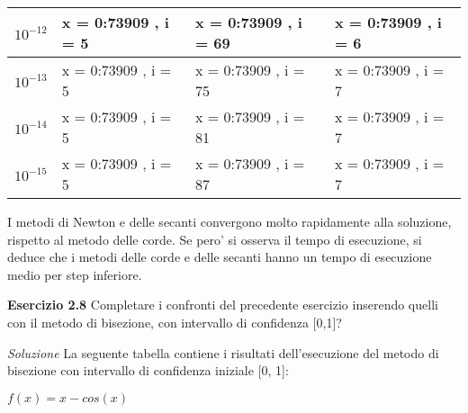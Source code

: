 \documentclass[20pt,a4paper]{book}
\begin{document}
\begin{tabular}{|l|l|l|l|}
\hline
\begin{math}10^{-12}\end{math} & x = 0:73909 , i = 5 & x = 0:73909 , i = 69 & x = 0:73909 , i = 6\\
\hline
\begin{math}10^{-13}\end{math} & x = 0:73909 , i = 5 & x = 0:73909 , i = 75 & x = 0:73909 , i = 7\\
\hline
\begin{math}10^{-14}\end{math} & x = 0:73909 , i = 5 & x = 0:73909 , i = 81 & x = 0:73909 , i = 7\\
\hline
\begin{math}10^{-15}\end{math} & x = 0:73909 , i = 5 & x = 0:73909 , i = 87 & x = 0:73909 , i = 7\\
\hline
\end{tabular}

\vspace{2mm}

I metodi di Newton e delle secanti convergono molto rapidamente alla soluzione, rispetto al metodo delle corde. Se pero' si osserva il tempo di esecuzione, si deduce che i metodi delle corde e delle secanti hanno un tempo di esecuzione medio per step inferiore.

\vspace{10mm}

\textbf{\Large{Esercizio 2.8}} Completare i confronti del precedente esercizio inserendo quelli con il metodo di bisezione, con intervallo di confidenza [0,1]? 

\textit{Soluzione}
La seguente tabella contiene i risultati dell’esecuzione del metodo di bisezione con intervallo
di confidenza iniziale [0, 1]:

\begin{math} f(x)=x-cos(x)\end{math}\\
\end{document}
